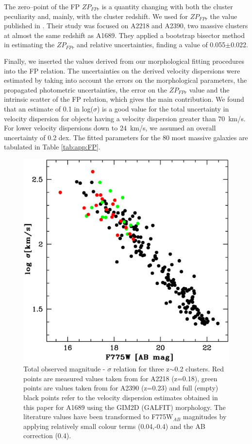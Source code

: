 \documentclass[useAMS,usenatbib]{mn2e}
\newcounter{two}   \setcounter{two}{2}
\newcounter{three} \setcounter{three}{3}
\begin{document}
The zero--point of the FP $ZP_{FPr}$ is a quantity changing with both
the cluster peculiarity and, mainly, with the cluster redshift. We
used for $ZP_{FPr}$ the value published in \citet{fritz:05}. Their
study was focused on A2218 and A2390, two massive clusters at almost
the same redshift as A1689. They applied a bootstrap bisector method
in estimating the $ZP_{FPr}$ and relative uncertainties, finding a
value of 0.055$\pm$0.022.

Finally, we inserted the values derived from our morphological fitting
procedures into the FP relation. The uncertainties on the derived
velocity dispersions were estimated by taking into account the errors
on the morphological parameters, the propagated photometric
uncertainties, the error on the $ZP_{FPr}$ value and the intrinsic
scatter of the FP relation, which gives the main contribution.  We
found that an estimate of 0.1 in log($\sigma$) is a good value for the
total uncertainty in velocity dispersion for objects having a velocity
dispersion greater than 70~km/s. For lower velocity dispersions down
to 24~km/s, we assumed an overall uncertainty of 0.2 dex. The fitted
parameters for the 80 most massive galaxies are tabulated in Table
\ref{tab:app:FP}.

\begin{figure}
  \centering
  \includegraphics[height=\columnwidth]{figs/sigma_comp.ps}
  \caption{Total observed magnitude - $\sigma$ relation for three
    z$\sim$0.2 clusters. Red points are measured values taken from
    \citet{ziegler:01} for A2218 (z=0.18), green points are values
    taken from \citet{fritz:05} for A2390 (z=0.23) and full (empty)
    black points refer to the velocity dispersion estimates obtained
    in this paper for A1689 using the GIM2D (GALFIT) morphology. The
    literature values have been transformed to F775W$_{AB}$ magnitudes
    by applying relatively small colour terms (0.04,-0.4) and the AB
    correction (0.4).}
  \label{fig:FJ}
\end{figure}
\end{document}
